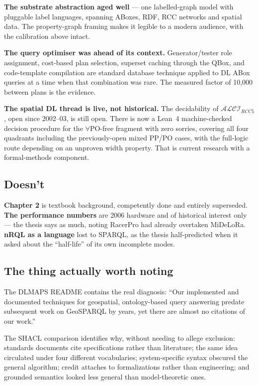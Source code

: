 \documentclass[11pt,a4paper,DIV=12,parskip=half]{scrartcl}
\begin{document}
\textbf{The substrate abstraction aged well} --- one labelled-graph model with
pluggable label languages, spanning ABoxes, RDF, RCC networks and spatial data.
The property-graph framing makes it legible to a modern audience, with the
calibration above intact.

\textbf{The query optimiser was ahead of its context.} Generator/tester role
assignment, cost-based plan selection, superset caching through the QBox, and
code-template compilation are standard database technique applied to DL ABox
queries at a time when that combination was rare. The measured factor of 10,000
between plans is the evidence.

\textbf{The spatial DL thread is live, not historical.} The decidability of
$\mathcal{ALCI}_{RCC5}$, open since 2002--03, is still open. There is now a
Lean~4 machine-checked decision procedure for the $\forall$PO-free fragment with
zero sorries, covering all four quadrants including the previously-open mixed
PP/PO cases, with the full-logic route depending on an unproven width property.
That is current research with a formal-methods component.

\subsection{Doesn't}

\textbf{Chapter 2} is textbook background, competently done and entirely
superseded. \textbf{The performance numbers} are 2006 hardware and of historical
interest only --- the thesis says as much, noting RacerPro had already overtaken
MiDeLoRa. \textbf{nRQL as a language} lost to SPARQL, as the thesis
half-predicted when it asked about the \enquote{half-life} of its own incomplete
modes.

\subsection{The thing actually worth noting}

The DLMAPS README contains the real diagnosis: \enquote{Our implemented and
documented techniques for geospatial, ontology-based query answering predate
subsequent work on GeoSPARQL by years, yet there are almost no citations of our
work.}

The SHACL comparison identifies why, without needing to allege exclusion:
standards documents cite specifications rather than literature; the same idea
circulated under four different vocabularies; system-specific syntax obscured the
general algorithm; credit attaches to formalizations rather than engineering; and
grounded semantics looked less general than model-theoretic ones.
\end{document}
